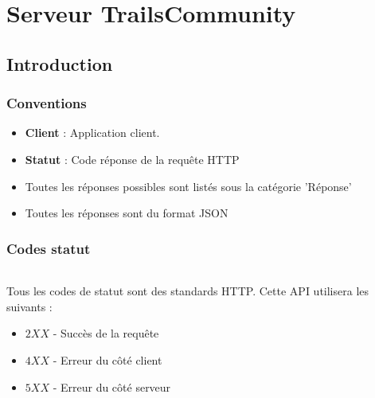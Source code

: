 \documentclass[titlepage, 12pt]{report}
\begin{document}
\part{Serveur TrailsCommunity}

\chapter{Introduction}

\section{Conventions}
\begin{itemize}
	\item \textbf{Client} : Application client.
	\item \textbf{Statut} : Code réponse de la requête HTTP
	\item Toutes les réponses possibles sont listés sous la catégorie 'Réponse'
	\item Toutes les réponses sont du format JSON
\end{itemize}


\section{Codes statut}

\paragraph{} Tous les codes de statut sont des standards HTTP. Cette API utilisera les suivants : 
\begin{itemize}
	\item $ 2XX $ - Succès de la requête
	\item $ 4XX $ - Erreur du côté client
	\item $ 5XX $ - Erreur du côté serveur		
\end{itemize}

\paragraph{}
\end{document}
